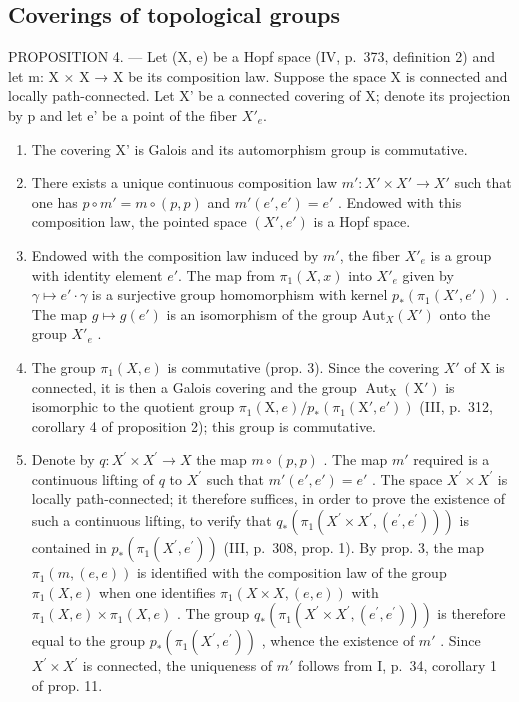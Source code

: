 \subsection{Coverings of topological groups}

PROPOSITION 4. --- Let (X, e) be a Hopf space (IV, p.~373, definition 2) and let m: X × X → X be its composition law. Suppose the space X is connected and locally path-connected. Let X' be a connected covering of X; denote its projection by p and let e' be a point of the fiber \(X'_{e}\).

\begin{enumerate}
\def\labelenumi{\alph{enumi})}
\item
  The covering X' is Galois and its automorphism group is commutative.
\item
  There exists a unique continuous composition law \(m' \colon X' \times X' \to X'\) such that one has \(p \circ m' = m \circ (p, p)\) and \(m'(e', e') = e'\) . Endowed with this composition law, the pointed space \((X', e')\) is a Hopf space.
\item
  Endowed with the composition law induced by \(m'\), the fiber \(X'_e\) is a group with identity element \(e'\). The map from \(\pi_1(X, x)\) into \(X'_e\) given by \(\gamma \mapsto e' \cdot \gamma\) is a surjective group homomorphism with kernel \(p_*(\pi_1(X', e'))\) . The map \(g \mapsto g(e')\) is an isomorphism of the group \(\text{Aut}_X(X')\) onto the group \(X'_e\) .
\item
  The group \(\pi_{1}(X,e)\) is commutative (prop. 3). Since the covering \(X'\) of X is connected, it is then a Galois covering and the group \(\operatorname{Aut}_{\mathrm{X}}(\mathrm{X}')\) is isomorphic to the quotient group \(\pi_{1}(\mathrm{X},e)/p_{*}(\pi_{1}(\mathrm{X}',e'))\) (III, p.~312, corollary 4 of proposition 2); this group is commutative.
\item
  Denote by \(q\colon X^{\prime}\times X^{\prime}\to X\) the map \(m\circ (p,p)\) . The map \(m'\) required is a continuous lifting of \(q\) to \(X^{\prime}\) such that \(m'(e',e') = e'\) . The space \(X^{\prime}\times X^{\prime}\) is locally path-connected; it therefore suffices, in order to prove the existence of such a continuous lifting, to verify that \(q_{*}(\pi_{1}(X^{\prime}\times X^{\prime},(e^{\prime},e^{\prime})))\) is contained in \(p_{*}(\pi_{1}(X^{\prime},e^{\prime}))\) (III, p.~308, prop. 1). By prop. 3, the map \(\pi_1(m,(e,e))\) is identified with the composition law of the group \(\pi_1(X,e)\) when one identifies \(\pi_1(X\times X,(e,e))\) with \(\pi_1(X,e)\times \pi_1(X,e)\) . The group \(q_{*}(\pi_{1}(X^{\prime}\times X^{\prime},(e^{\prime},e^{\prime})))\) is therefore equal to the group \(p_{*}(\pi_{1}(X^{\prime},e^{\prime}))\) , whence the existence of \(m'\) . Since \(X^{\prime}\times X^{\prime}\) is connected, the uniqueness of \(m'\) follows from I, p.~34, corollary 1 of prop. 11.
\end{enumerate}


